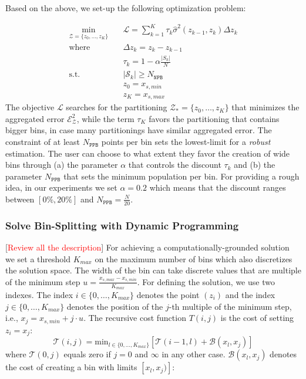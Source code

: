 \documentclass[twoside]{article}
\newcommand{\todo}[1]{[\textcolor{red}{#1}]}
\begin{document}
Based on the above, we set-up the following optimization problem:

\begin{equation}
  \label{eq:opt}
\begin{aligned}
  \min_{ \mathcal{Z} = \{z_0, \ldots, z_K\}} \quad & \mathcal{L} = \sum_{k=1}^K \tau_k \hat{\sigma}^2(z_{k-1}, z_k) \Delta z_k \\
  \textrm{where} \quad & \Delta z_k = z_k - z_{k-1} \\
  & \tau_k = 1 - \alpha \frac{|S_k|}{N} \\
  \textrm{s.t.} \quad & |\mathcal{S}_k| \geq N_{\mathtt{NPB}}\\
                                     & z_0 = x_{s,min}\\
                                     & z_K = x_{s, max}
\end{aligned}
\end{equation}
%
The objective \(\mathcal{L}\) searches for the partitioning
\(\mathcal{Z}_* = \{ z_0, \ldots, z_K \} \) that minimizes the
aggregated error \(\mathcal{E}_{\mathcal{Z}}^2\), while the term
\(\tau_K\) favors the partitioning that contains bigger bins, in case
many partitionings have similar aggregated error. The constraint of at
least \(N_{\mathtt{PPB}}\) points per bin sets the lowest-limit for a
\textit{robust} estimation. The user can choose to what extent they
favor the creation of wide bins through (a) the parameter \(\alpha\)
that controls the discount \(\tau_k\) and (b) the parameter
\(N_{\mathtt{PPB}}\) that sets the minimum population per bin. For
providing a rough idea, in our experiments we set \(\alpha = 0.2\)
which means that the discount ranges between \([0\%, 20\%]\) and
\(N_{\mathtt{PPB}} = \frac{N}{20}\).

\subsubsection{Solve Bin-Splitting with Dynamic Programming}
\label{sec:dynamic-programing}

\todo{Review all the description}
For achieving a computationally-grounded solution we set a threshold
\(K_{max}\) on the maximum number of bins which also discretizes the
solution space. The width of the bin can take discrete values that are
multiple of the minimum step
\(u = \frac{x_{s, max} - x_{s, min}}{K_{max}}\). For defining the
solution, we use two indexes. The index
\(i \in \{0, \ldots, K_{max}\}\) denotes the point \((z_i)\) and the
index \(j \in \{0, \ldots, K_{max}\} \) denotes the position of the
\(j\)-th multiple of the minimum step, i.e., 
\(x_j = x_{s,min} + j \cdot u\). The recursive cost function
\(T(i,j)\) is the cost of setting \(z_i=x_j\):
\begin{equation}
  \label{eq:recursive_cost}
  \mathcal{T}(i,j) = \mathrm{min}_{l \in \{0, \ldots, K_{max}\}} \left [ \mathcal{T}(i-1, l) + \mathcal{B}(x_l, x_j) \right ]
\end{equation}
%
where \(\mathcal{T}(0,j)\) equals zero if \(j=0\) and \(\infty\) in
any other case. \(\mathcal{B}(x_l, x_j)\) denotes the cost of creating a bin
with limits \([x_l, x_j)]\):
\end{document}
